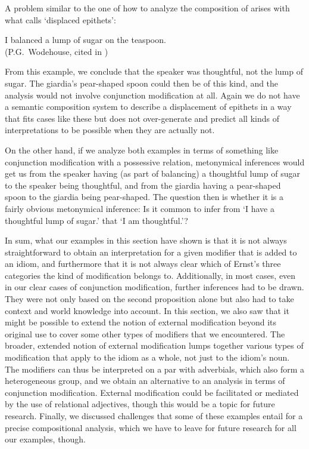 \documentclass[output=paper]{langsci/langscibook}
\begin{document}
A problem similar to the one of how to analyze the composition of  arises with what \cite[66]{ernst81} calls `displaced epithets':

\ea
I balanced a \underline{} lump of sugar on the teaspoon. \\
(P.G.\ Wodehouse, cited in \citealt{Hall73})
\z

\noindent From this example, we conclude that the speaker was thoughtful, not the lump of sugar. The giardia's pear-shaped spoon could then be of this kind, and the analysis would not involve conjunction modification at all. Again we do not have a semantic composition system to describe a displacement of epithets in a way that fits cases like these but does not over-generate and predict all kinds of interpretations to be possible when they are actually not. 

On the other hand, if we analyze both examples in terms of something like conjunction modification with a possessive relation, metonymical inferences would get us from the speaker having (as part of balancing) a thoughtful lump of sugar to the speaker being thoughtful, and from the giardia having a pear-shaped spoon to the giardia being pear-shaped. The question then is whether it is a fairly obvious metonymical inference: Is it common to infer from `I have a thoughtful lump of sugar.' that `I am thoughtful.'?

In sum, what our examples in this section have shown is that it is not always straightforward to obtain an interpretation for a given modifier that is added to an idiom, and furthermore that it is not always clear which of Ernst's three categories the kind of modification belongs to. Additionally, in most cases, even in our clear cases of conjunction modification, further inferences had to be drawn. They were not only based on the second proposition alone but also had to take context and world knowledge into account. In this section, we also saw that it might be possible to extend the notion of external modification beyond its original use to cover some other types of modifiers that we encountered. The broader, extended notion of external modification lumps together various types of modification that apply to the idiom as a whole, not just to the idiom's noun. The modifiers can thus be interpreted on a par with adverbials, which also form a heterogeneous group, and we obtain an alternative to an analysis in terms of conjunction modification. External modification could be facilitated or mediated by the use of relational adjectives, though this would be a topic for future research. Finally, we discussed challenges that some of these examples entail for a precise compositional analysis, which we have to leave for future research for all our examples, though.
\end{document}
